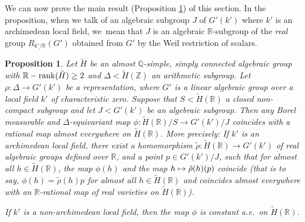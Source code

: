 \documentclass[10pt,a4paper]{amsart}
\def\mto{\mathchoice{\longmapsto}{\mapsto}{\mapsto}{\mapsto}}
\newcommand{\Rrank}{\R\textup{-}\rank}
\newtheorem{proposition}[theorem]{Proposition}
\theoremstyle{definition}
\newcommand{\field}[1]{\mathbb{#1}}
\newcommand{\Q}{\field{Q}}
\newcommand{\R}{\field{R}}
\newcommand{\Z}{\field{Z}}
\newcommand{\rank}{{\operatorname{rank}}}
\begin{document}
We can now prove the main result (Proposition \ref{rational}) of this section. In the proposition, when we talk of an algebraic subgroup $J$ of $G'(k')$ where $k'$ is an archimedean local field, we~mean that $J$ is an algebraic $\R$-subgroup of the \emph{real} group $R_{k'/\R}(G')$ obtained from $G'$ by the Weil restriction of scalars.

\begin{proposition}\label{rational} Let $\tilde{H}$ be an almost $\Q$-simple, simply connected algebraic
group with $\Rrank(\tilde{H})\geq 2$ and $\Delta <\tilde{H}(\Z)$ an arithmetic subgroup. Let $\rho :\Delta \to G'(k')$ be a representation, where $G'$ is a linear algebraic group over a local field $k'$ of characteristic zero. Suppose that $S<\tilde{H}(\R)$ a closed non-compact subgroup and let $J<G'(k')$ be an algebraic subgroup. Then any Borel measurable and $\Delta$-equivariant map $\phi :\tilde H(\R)/S\to G'(k')/J$ coincides with a rational
map almost everywhere on $\tilde{H}(\R)$. More precisely:
If $k'$ is an archimedean local field, there exist a homomorphism
$\tilde \rho : \tilde H(\R) \to G'(k')$ of real algebraic groups
defined over $\R$, and a point $p\in G'(k')/J$, such that for almost all $h\in \tilde{H}(\R)$, the map $\phi
(h)$ and the map $h\mto \tilde \rho (h)(p)$ coincide (that is to say, $\phi (h)=\tilde \rho (h)p$ for almost all $h\in \tilde H(\R)$ and coincides almost everywhere with an $\R$-rational map of real varieties on $\tilde{H}(\R)$).

If $k'$ is a non-archimedean local field, then the map $\phi$ is constant a.e.\ on $\tilde{H}(\R)$.
\end{proposition}
\end{document}
